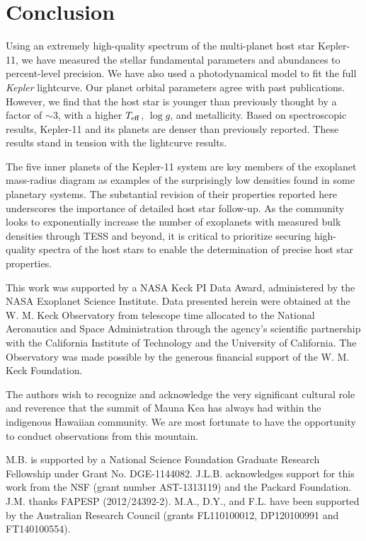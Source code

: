 \documentclass[twocolumn,trackchanges]{aastex61}
\newcommand{\teff}{$T_{\rm eff}$}
\newcommand{\logg}{$\log g$}
\newcommand{\Kepler}{\textit{Kepler} }
\begin{document}
\section{Conclusion}

Using an extremely high-quality spectrum of the multi-planet host star Kepler-11, we have measured the stellar fundamental parameters and abundances to percent-level precision. We have also used a photodynamical model to fit the full \Kepler lightcurve. Our planet orbital parameters agree with past publications. However, we find that the host star is younger than previously thought by a factor of $\sim$3, with a higher \teff, \logg, and metallicity. Based on spectroscopic results, Kepler-11 and its planets are  denser than previously reported. These results stand in tension with the lightcurve results.

The five inner planets of the Kepler-11 system are key members of the exoplanet mass-radius diagram as examples of the surprisingly low densities found in some planetary systems. The substantial revision of their properties reported here underscores the importance of detailed host star follow-up. As the community looks to exponentially increase the number of exoplanets with measured bulk densities through TESS and beyond, it is critical to prioritize securing high-quality spectra of the host stars to enable the determination of precise host star properties.

\bigskip
\acknowledgements


This work was supported by a NASA Keck PI Data Award, administered by the NASA Exoplanet Science Institute. Data presented herein were obtained at the W. M. Keck Observatory from telescope time allocated to the National Aeronautics and Space Administration through the agency's scientific partnership with the California Institute of Technology and the University of California. The Observatory was made possible by the generous financial support of the W. M. Keck Foundation.

The authors wish to recognize and acknowledge the very significant cultural role and reverence that the summit of Mauna Kea has always had within the indigenous Hawaiian community. We are most fortunate to have the opportunity to conduct observations from this mountain.

M.B. is supported by a National Science Foundation Graduate Research Fellowship under Grant No. DGE-1144082.  J.L.B. acknowledges support for this work from the NSF (grant number AST-1313119) and the Packard Foundation.  J.M. thanks FAPESP (2012/24392-2). M.A., D.Y., and F.L. have been supported by the Australian Research Council
(grants FL110100012, DP120100991 and FT140100554).
\end{document}
